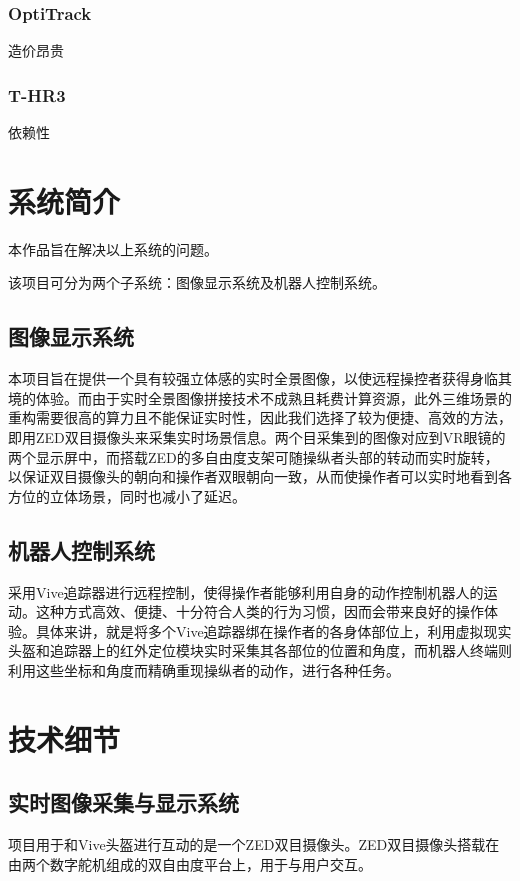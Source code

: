 \subsection{OptiTrack}
造价昂贵
\subsection{T-HR3}
依赖性
\subsection{}


\chapter{系统简介}
本作品旨在解决以上系统的问题。

	该项目可分为两个子系统：图像显示系统及机器人控制系统。
	\section{图像显示系统}
	本项目旨在提供一个具有较强立体感的实时全景图像，以使远程操控者获得身临其境的体验。而由于实时全景图像拼接技术不成熟且耗费计算资源，此外三维场景的重构需要很高的算力且不能保证实时性，因此我们选择了较为便捷、高效的方法，即用ZED双目摄像头来采集实时场景信息。两个目采集到的图像对应到VR眼镜的两个显示屏中，而搭载ZED的多自由度支架可随操纵者头部的转动而实时旋转，以保证双目摄像头的朝向和操作者双眼朝向一致，从而使操作者可以实时地看到各方位的立体场景，同时也减小了延迟。
	\section{机器人控制系统}
	采用Vive追踪器进行远程控制，使得操作者能够利用自身的动作控制机器人的运动。这种方式高效、便捷、十分符合人类的行为习惯，因而会带来良好的操作体验。具体来讲，就是将多个Vive追踪器绑在操作者的各身体部位上，利用虚拟现实头盔和追踪器上的红外定位模块实时采集其各部位的位置和角度，而机器人终端则利用这些坐标和角度而精确重现操纵者的动作，进行各种任务。





\chapter{技术细节}

\section{实时图像采集与显示系统}
项目用于和Vive头盔进行互动的是一个ZED双目摄像头。ZED双目摄像头搭载在由两个数字舵机组成的双自由度平台上，用于与用户交互。

